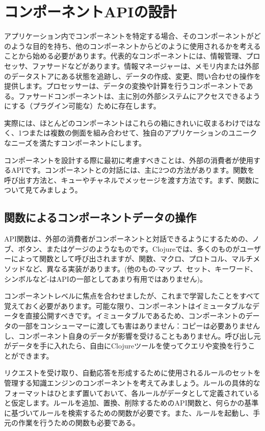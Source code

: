 \section{コンポーネントAPIの設計}

アプリケーション内でコンポーネントを特定する場合、そのコンポーネントがどのような目的を持ち、他のコンポーネントからどのように使用されるかを考えることから始める必要があります。代表的なコンポーネントには、情報管理、プロセッサ、ファサードなどがあります。情報マネージャーは、メモリ内または外部のデータストアにある状態を追跡し、データの作成、変更、問い合わせの操作を提供します。プロセッサーは、データの変換や計算を行うコンポーネントである。ファサードコンポーネントは、主に別の外部システムにアクセスできるようにする（プラグイン可能な）ために存在します。

実際には、ほとんどのコンポーネントはこれらの箱にきれいに収まるわけではなく、1つまたは複数の側面を組み合わせて、独自のアプリケーションのユニークなニーズを満たすコンポーネントにします。

コンポーネントを設計する際に最初に考慮すべきことは、外部の消費者が使用するAPIです。コンポーネントとの対話には、主に2つの方法があります。関数を呼び出す方法と、キューやチャネルでメッセージを渡す方法です。まず、関数について見てみましょう。

\subsection{関数によるコンポーネントデータの操作}

API関数は、外部の消費者がコンポーネントと対話できるようにするための、ノブ、ボタン、またはゲージのようなものです。Clojureでは、多くのものがユーザーによって関数として呼び出されますが、関数、マクロ、プロトコル、マルチメソッドなど、異なる実装があります。(他のもの-マップ、セット、キーワード、シンボルなど-はAPIの一部としてあまり有用ではありません)。

コンポーネントレベルに焦点を合わせましたが、これまで学習したことをすべて覚えておく必要があります。可能な限り、コンポーネントはイミュータブルなデータを直接公開すべきです。イミュータブルであるため、コンポーネントのデータの一部をコンシューマーに渡しても害はありません：コピーは必要ありませんし、コンポーネント自身のデータが影響を受けることもありません。呼び出し元がデータを手に入れたら、自由にClojureツールを使ってクエリや変換を行うことができます。

リクエストを受け取り、自動応答を形成するために使用されるルールのセットを管理する知識エンジンのコンポーネントを考えてみましょう。ルールの具体的なフォーマットはひとまず置いておいて、各ルールがデータとして定義されていると仮定します。ルールを追加、置換、削除するためのAPI関数と、何らかの基準に基づいてルールを検索するための関数が必要です。また、ルールを起動し、手元の作業を行うための関数も必要である。

